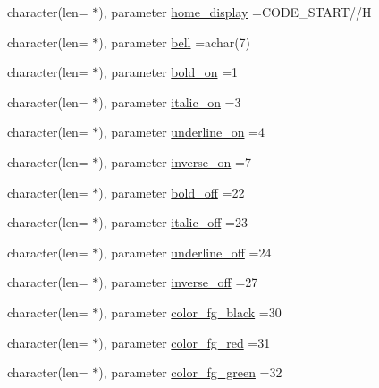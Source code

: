 \begin{DoxyCompactItemize}
\item 
character(len= $\ast$), parameter \mbox{\hyperlink{namespacem__escape_ae4634ac062742627f215df29998fc677}{home\+\_\+display}} =C\+O\+D\+E\+\_\+\+S\+T\+A\+RT//\textquotesingle{}H\textquotesingle{}
\item 
character(len= $\ast$), parameter \mbox{\hyperlink{namespacem__escape_a2cd9c30d3783af9d1f74a50e7f1dbd7f}{bell}} =achar(7)
\item 
character(len= $\ast$), parameter \mbox{\hyperlink{namespacem__escape_a8f30470c66af08cf881d9afe23357a03}{bold\+\_\+on}} =\textquotesingle{}1\textquotesingle{}
\item 
character(len= $\ast$), parameter \mbox{\hyperlink{namespacem__escape_a5bd07ea0cedbfd7d0e04b3b0be74821f}{italic\+\_\+on}} =\textquotesingle{}3\textquotesingle{}
\item 
character(len= $\ast$), parameter \mbox{\hyperlink{namespacem__escape_a6f4bcc5f8acb0683ed6d8e05c0100daa}{underline\+\_\+on}} =\textquotesingle{}4\textquotesingle{}
\item 
character(len= $\ast$), parameter \mbox{\hyperlink{namespacem__escape_afacdc9d33171b768ee026b1eb6726f8a}{inverse\+\_\+on}} =\textquotesingle{}7\textquotesingle{}
\item 
character(len= $\ast$), parameter \mbox{\hyperlink{namespacem__escape_a978fe9a5d07621c57c3163d8a7a62118}{bold\+\_\+off}} =\textquotesingle{}22\textquotesingle{}
\item 
character(len= $\ast$), parameter \mbox{\hyperlink{namespacem__escape_a93fc5a4e6f0ed044c9f6cf29412a05cb}{italic\+\_\+off}} =\textquotesingle{}23\textquotesingle{}
\item 
character(len= $\ast$), parameter \mbox{\hyperlink{namespacem__escape_a9e36a1a9bd4a64702ecef4a2e3d592b9}{underline\+\_\+off}} =\textquotesingle{}24\textquotesingle{}
\item 
character(len= $\ast$), parameter \mbox{\hyperlink{namespacem__escape_affae80c7d63858227a9f3134e6191f96}{inverse\+\_\+off}} =\textquotesingle{}27\textquotesingle{}
\item 
character(len= $\ast$), parameter \mbox{\hyperlink{namespacem__escape_a6c7b72b2cfc0a6ec7fc4080ad6750d99}{color\+\_\+fg\+\_\+black}} =\textquotesingle{}30\textquotesingle{}
\item 
character(len= $\ast$), parameter \mbox{\hyperlink{namespacem__escape_a35eecf0fb916821d94b9c47b2045fe44}{color\+\_\+fg\+\_\+red}} =\textquotesingle{}31\textquotesingle{}
\item 
character(len= $\ast$), parameter \mbox{\hyperlink{namespacem__escape_aeab9b03c1de2c6fb13031c9ca55f9105}{color\+\_\+fg\+\_\+green}} =\textquotesingle{}32\textquotesingle{}

\end{DoxyCompactItemize}
